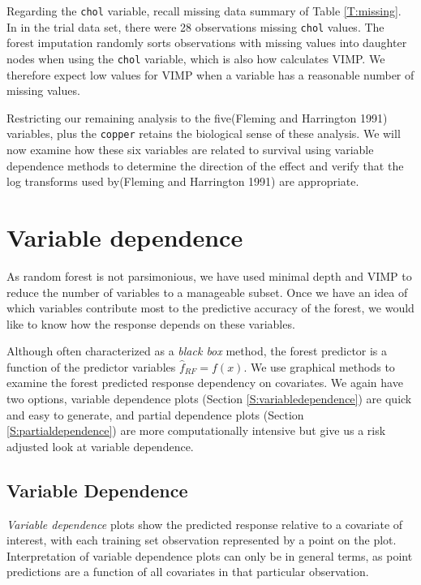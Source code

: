 \documentclass[article, nojss]{jss}
\begin{document}
Regarding the \texttt{chol} variable, recall missing data summary of
Table \ref{T:missing}. In in the trial data set, there were 28
observations missing \texttt{chol} values. The forest imputation
randomly sorts observations with missing values into daughter nodes when
using the \texttt{chol} variable, which is also how
 calculates VIMP. We therefore expect low values
for VIMP when a variable has a reasonable number of missing values.

Restricting our remaining analysis to the five(Fleming and Harrington
1991) variables, plus the \texttt{copper} retains the biological sense
of these analysis. We will now examine how these six variables are
related to survival using variable dependence methods to determine the
direction of the effect and verify that the log transforms used
by(Fleming and Harrington 1991) are appropriate.

\section{Variable dependence}\label{variable-dependence}

As random forest is not parsimonious, we have used minimal depth and
VIMP to reduce the number of variables to a manageable subset. Once we
have an idea of which variables contribute most to the predictive
accuracy of the forest, we would like to know how the response depends
on these variables.

Although often characterized as a \emph{black box} method, the forest
predictor is a function of the predictor variables
\(\hat{f}_{RF} = f(x).\) We use graphical methods to examine the forest
predicted response dependency on covariates. We again have two options,
variable dependence plots (Section \ref{S:variabledependence}) are quick
and easy to generate, and partial dependence plots (Section
\ref{S:partialdependence}) are more computationally intensive but give
us a risk adjusted look at variable dependence.

\subsection{Variable Dependence}\label{variable-dependence-1}

\emph{Variable dependence} plots show the predicted response relative to
a covariate of interest, with each training set observation represented
by a point on the plot. Interpretation of variable dependence plots can
only be in general terms, as point predictions are a function of all
covariates in that particular observation.
\end{document}
